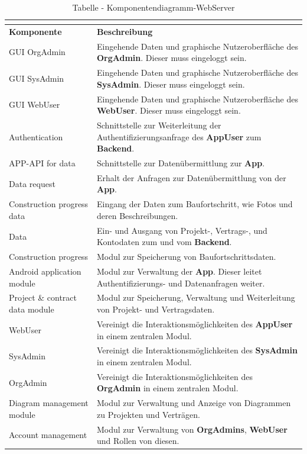 \begin{longtable}[h]{|p{2.5cm}|p{10.0cm}|}
	\caption{Tabelle - Komponentendiagramm-WebServer}
	\centering
	\label{tab:table_comp_webserver}
	\endlastfoot
	\hline \multicolumn{2}{|r|}{{Weitergeführt auf der folgenden Seite}} \\ \hline
	\endfoot
	\endhead
	\hline
	\textbf{Komponente} & \textbf{Beschreibung} \\ 
	\hline
	GUI OrgAdmin & Eingehende Daten und graphische Nutzeroberfläche des \textbf{OrgAdmin}. Dieser muss eingeloggt sein. \\
	\hline
	GUI SysAdmin & Eingehende Daten und graphische Nutzeroberfläche des \textbf{SysAdmin}. Dieser muss eingeloggt sein. \\
	\hline
	GUI WebUser & Eingehende Daten und graphische Nutzeroberfläche des \textbf{WebUser}. Dieser muss eingeloggt sein. \\
	\hline
	Authentication & Schnittstelle zur Weiterleitung der Authentifizierungsanfrage des \textbf{AppUser} zum \textbf{Backend}. \\
	\hline
	APP-API for data & Schnittstelle zur Datenübermittlung zur \textbf{App}. \\
	\hline
	Data request & Erhalt der Anfragen zur Datenübermittlung von der \textbf{App}. \\
	\hline
	Construction progress data & Eingang der Daten zum Baufortschritt, wie Fotos und deren Beschreibungen. \\
	\hline
	Data & Ein- und Ausgang von Projekt-, Vertrags-, und Kontodaten zum und vom \textbf{Backend}. \\
	\hline
	Construction progress & Modul zur Speicherung von Baufortschrittsdaten. \\
	\hline
	Android application module & Modul zur Verwaltung der \textbf{App}. Dieser leitet Authentifizierungs- und Datenanfragen weiter. \\
	\hline
	Project {\&} contract data module & Modul zur Speicherung, Verwaltung und Weiterleitung von Projekt- und Vertragsdaten. \\
	\hline
	WebUser & Vereinigt die Interaktionsmöglichkeiten des \textbf{AppUser} in einem zentralen Modul. \\
	\hline
	SysAdmin & Vereinigt die Interaktionsmöglichkeiten des \textbf{SysAdmin} in einem zentralen Modul. \\
	\hline
	OrgAdmin & Vereinigt die Interaktionsmöglichkeiten des \textbf{OrgAdmin} in einem zentralen Modul. \\
	\hline
	Diagram management module & Modul zur Verwaltung und Anzeige von Diagrammen zu Projekten und Verträgen. \\
	\hline
	Account management & Modul zur Verwaltung von \textbf{OrgAdmins}, \textbf{WebUser} und Rollen von diesen. \\
	\hline
\end{longtable}

